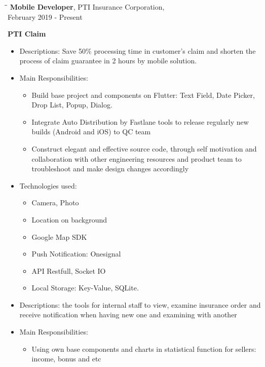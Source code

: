 \documentclass[margin, 10pt]{res}
\begin{document}
\begin{resume}
   \begin{tabbing}
   \hspace{2.0in}\= \hspace{2.0in}\= \kill %
   {\bf Mobile Developer}, PTI Insurance Corporation, \\February 2019 - Present\\
   \end{tabbing}
	\vspace{-20pt} %
 	{\bf PTI Claim}
   \begin{itemize}
   	\item Descriptions: Save 50\% processing time in customer’s claim and shorten the process of claim guarantee in 2 hours by mobile solution.
   	\item Main Responsibilities:
   	\begin{itemize}
   		\item Build base project and components on Flutter: Text Field, Date Picker, Drop List, Popup, Dialog.
   		\item Integrate Auto Distribution by Fastlane tools to release regularly new builds (Android and iOS) to QC team
   		\item Construct elegant and effective source code, through self motivation and collaboration with other engineering resources 
		and product team to troubleshoot and make design changes accordingly
	\end{itemize}
	\item Technologies used:
	\begin{itemize}
		\item Camera, Photo
		\item Location on background
		\item Google Map SDK
		\item Push Notification: Onesignal
		\item API Restfull, Socket IO
		\item Local Storage: Key-Value, SQLite.
	\end{itemize}
	\hspace{-27pt}{\bf PTI Portal}
	\item Descriptions: the tools for internal staff to view, examine insurance order and receive notification when having new one and examining with another
	\item Main Responsibilities:
	\begin{itemize}
		\item Using own base components and charts in statistical function for sellers: income, bonus and etc
	\end{itemize}
	

\end{itemize}
\end{resume}
\end{document}
